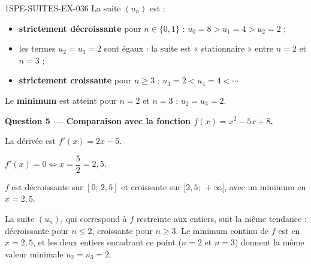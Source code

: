 \begin{corrige}{1SPE-SUITES-EX-036}
La suite $(u_n)$ est :
\begin{itemize}
  \item \textbf{strictement décroissante} pour $n \in \{0, 1\}$ : $u_0 = 8 > u_1 = 4 > u_2 = 2$ ;
  \item les termes $u_2 = u_3 = 2$ sont égaux : la suite est « stationnaire » entre $n = 2$ et $n = 3$ ;
  \item \textbf{strictement croissante} pour $n \geq 3$ : $u_3 = 2 < u_4 = 4 < \cdots$
\end{itemize}

Le \textbf{minimum} est atteint pour $n = 2$ et $n = 3$ : $u_2 = u_3 = 2$.

\medskip
\textbf{Question 5 — Comparaison avec la fonction $f(x) = x^2 - 5x + 8$.}

La dérivée est $f'(x) = 2x - 5$.

$f'(x) = 0 \iff x = \dfrac{5}{2} = 2{,}5$.


$f$ est décroissante sur $[0;\, 2{,}5]$ et croissante sur $[2{,}5;\, +\infty[$, avec un minimum en $x = 2{,}5$.

La suite $(u_n)$, qui correspond à $f$ restreinte aux entiers, suit la même tendance : décroissante pour $n \leq 2$, croissante pour $n \geq 3$. Le minimum continu de $f$ est en $x = 2{,}5$, et les deux entiers encadrant ce point ($n = 2$ et $n = 3$) donnent la même valeur minimale $u_2 = u_3 = 2$.

\end{corrige}
